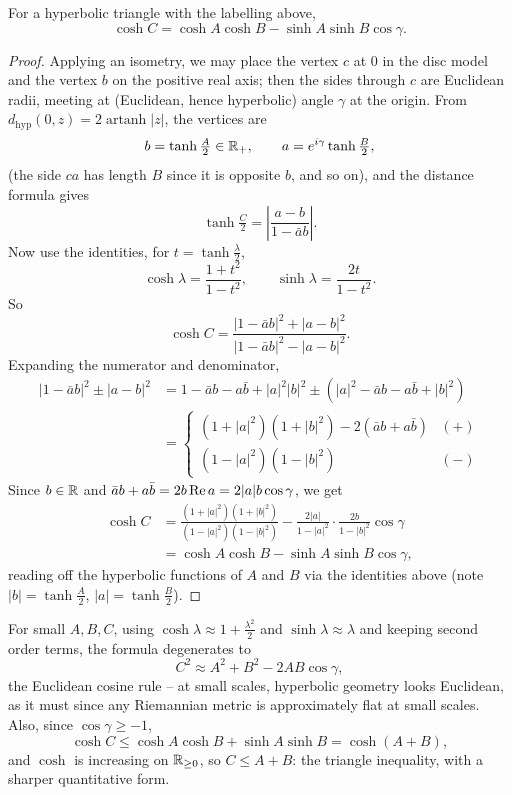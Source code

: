 \documentclass[a4paper]{scrartcl}
\DeclareMathOperator{\artanh}{artanh}
\begin{document}
\begin{proposition}
    For a hyperbolic triangle with the labelling above,
    $$
    \cosh C = \cosh A \cosh B - \sinh A \sinh B \cos \gamma.
    $$
\end{proposition}
\begin{proof}
    Applying an isometry, we may place the vertex $c$ at $0$ in the disc model and the vertex $b$ on the positive real axis; then the sides through $c$ are Euclidean radii, meeting at (Euclidean, hence hyperbolic) angle $\gamma$ at the origin. From $d_{\mathrm{hyp}}(0, z) = 2\artanh|z|$, the vertices are
    $$
    b = \tanh\tfrac{A}{2} \in \mathbb{R}_+, \qquad a = e^{i\gamma}\tanh\tfrac{B}{2},
    $$
    (the side $ca$ has length $B$ since it is opposite $b$, and so on), and the distance formula gives
    $$
    \tanh \tfrac{C}{2} = \left|\frac{a - b}{1 - \bar a b}\right|.
    $$
    Now use the identities, for $t = \tanh\frac{\lambda}{2}$,
    $$
    \cosh \lambda = \frac{1 + t^2}{1 - t^2}, \qquad \sinh \lambda = \frac{2t}{1 - t^2}.
    $$
    So
    $$
    \cosh C = \frac{|1 - \bar a b|^2 + |a - b|^2}{|1 - \bar a b|^2 - |a - b|^2}.
    $$
    Expanding the numerator and denominator,
    \begin{align*}
        |1 - \bar a b|^2 \pm |a - b|^2 &= 1 - \bar a b - a \bar b + |a|^2 |b|^2 \pm \left(|a|^2 - \bar a b - a \bar b + |b|^2\right) \\
        &= \begin{cases}
            (1 + |a|^2)(1 + |b|^2) - 2(\bar a b + a \bar b) & (+)\\
            (1 - |a|^2)(1 - |b|^2) & (-)
        \end{cases}
    \end{align*}
    Since $b \in \mathbb{R}$ and $\bar a b + a \bar b = 2 b \operatorname{Re} a = 2 |a| b \cos\gamma$, we get
    \begin{align*}
    \cosh C &= \frac{(1 + |a|^2)(1 + |b|^2)}{(1 - |a|^2)(1 - |b|^2)} - \frac{2|a|}{1 - |a|^2}\cdot\frac{2 b}{1 - |b|^2}\cos\gamma \\
    &= \cosh A \cosh B - \sinh A \sinh B \cos\gamma,
    \end{align*}
    reading off the hyperbolic functions of $A$ and $B$ via the identities above (note $|b| = \tanh\frac{A}{2}$, $|a| = \tanh\frac{B}{2}$).
\end{proof}

\begin{remark}
    For small $A, B, C$, using $\cosh \lambda \approx 1 + \frac{\lambda^2}{2}$ and $\sinh\lambda \approx \lambda$ and keeping second order terms, the formula degenerates to
    $$
    C^2 \approx A^2 + B^2 - 2AB\cos\gamma,
    $$
    the Euclidean cosine rule -- at small scales, hyperbolic geometry looks Euclidean, as it must since any Riemannian metric is approximately flat at small scales. Also, since $\cos \gamma \geq -1$,
    $$
    \cosh C \leq \cosh A \cosh B + \sinh A \sinh B = \cosh(A + B),
    $$
    and $\cosh$ is increasing on $\mathbb{R}_{\geq 0}$, so $C \leq A + B$: the triangle inequality, with a sharper quantitative form.
\end{remark}
\end{document}
